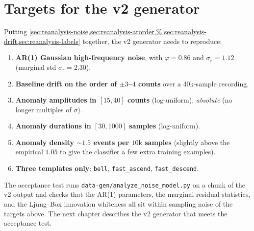 \section{Targets for the v2 generator}
\label{sec:reanalysis-targets}

Putting \cref{sec:reanalysis-noise,sec:reanalysis-arorder,%
sec:reanalysis-drift,sec:reanalysis-labels} together, the v2 generator
needs to reproduce:

\begin{enumerate}[leftmargin=*, itemsep=0.2em]
    \item \textbf{AR(1) Gaussian high-frequency noise}, with
    $\varphi = 0.86$ and $\sigma_\varepsilon = 1.12$ (marginal std
    $\sigma_r = 2.30$).
    \item \textbf{Baseline drift on the order of $\pm 3$--$4$ counts}
    over a $40$k-sample recording.
    \item \textbf{Anomaly amplitudes in $[15, 40]$ counts}
    (log-uniform), \emph{absolute} (no longer multiples of $\sigma$).
    \item \textbf{Anomaly durations in $[30, 1000]$ samples}
    (log-uniform).
    \item \textbf{Anomaly density $\sim 1.5$ events per $10\text{k}$
    samples} (slightly above the empirical $1.05$ to give the
    classifier a few extra training examples).
    \item \textbf{Three templates only}: \texttt{bell},
    \texttt{fast\_ascend}, \texttt{fast\_descend}.
\end{enumerate}

The acceptance test runs
\texttt{data-gen/analyze\_noise\_model.py} on a chunk of the v2 output
and checks that the AR(1) parameters, the marginal residual statistics,
and the Ljung--Box innovation whiteness all sit within sampling noise
of the targets above. The next chapter describes the v2 generator that
meets the acceptance test.
